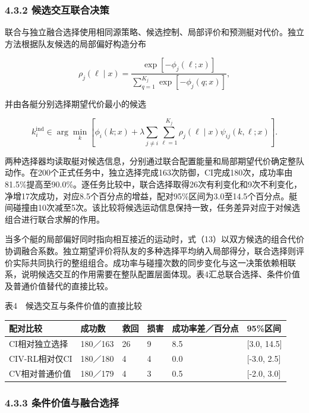 \documentclass[UTF8,10.5pt,a4paper,fontset=none]{ctexart}
\begin{document}
\subsubsection{4.3.2
候选交互联合决策}\label{ux5019ux9009ux4ea4ux4e92ux8054ux5408ux51b3ux7b56}

联合与独立融合选择使用相同源策略、候选控制、局部评价和预测艇对代价。独立方法根据队友候选的局部偏好构造分布

\[
\rho_j(\ell\mid x)=
\frac{\exp[-\phi_j(\ell;x)]}
{\sum_{q=1}^{K_j}\exp[-\phi_j(q;x)]},
\tag{32}
\]

并由各艇分别选择期望代价最小的候选

\[
k_i^{\mathrm{ind}}\in\arg\min_k
\left[
\phi_i(k;x)+\lambda\sum_{j\ne i}
\sum_{\ell=1}^{K_j}\rho_j(\ell\mid x)\psi_{ij}(k,\ell;x)
\right].
\tag{33}
\]

两种选择器均读取艇对候选信息，分别通过联合配置能量和局部期望代价确定整队动作。在200个正式任务中，独立选择完成163次防御，CI完成180次，成功率由81.5\%提高至90.0\%。逐任务比较中，联合选择取得26次有利变化和9次不利变化，净增17次成功，对应8.5个百分点的增益，配对95\%区间为3.0至14.5个百分点。艇间碰撞由10次减至5次。该比较将候选运动信息保持一致，任务差异对应于对候选组合进行联合求解的作用。

当多个艇的局部偏好同时指向相互接近的运动时，式（13）以双方候选的组合代价协调融合系数。独立期望评价将队友的多种选择平均纳入局部得分，联合选择则评价实际共同执行的整组组合。成功率与碰撞次数的同步变化与这一决策依赖相联系，说明候选交互的作用需要在整队配置层面体现。表4汇总联合选择、条件价值及普通价值替代的直接比较。

\begin{center}\small 表4　候选交互与条件价值的直接比较\end{center}

\begingroup\small
\begin{longtable}[]{@{}llllll@{}}
\toprule\noalign{}
配对比较 & 成功数 & 救回 & 损害 & 成功率差／百分点 & 95\%区间 \\
\midrule\noalign{}
\endhead
\bottomrule\noalign{}
\endlastfoot
CI相对独立选择 & 180／163 & 26 & 9 & 8.5 & {[}3.0, 14.5{]} \\
CIV-RL相对仅CI & 180／180 & 4 & 4 & 0.0 & {[}-3.0, 2.5{]} \\
CV相对普通价值 & 180／179 & 4 & 3 & 0.5 & {[}-2.0, 3.0{]} \\
\end{longtable}
\endgroup

\subsubsection{4.3.3
条件价值与融合选择}\label{ux6761ux4ef6ux4ef7ux503cux4e0eux878dux5408ux9009ux62e9}
\end{document}

